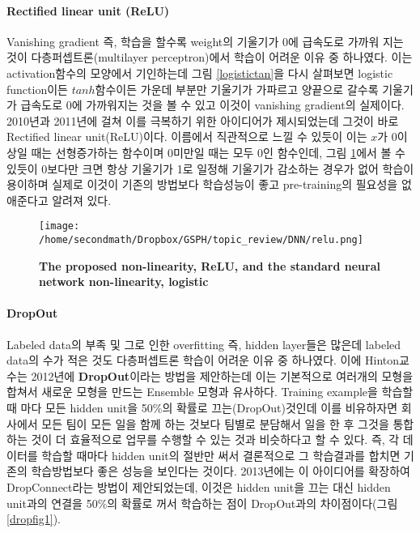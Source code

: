 \documentclass[10pt]{article}
\begin{document}
\paragraph{Rectified linear unit (ReLU)}
Vanishing gradient 즉, 학습을 할수록 weight의 기울기가 0에 급속도로 가까워 지는 것이 다층퍼셉트론(multilayer perceptron)에서 학습이 어려운 이유 중 하나였다. 이는 activation함수의 모양에서 기인하는데 그림 \ref{logistictan}을 다시 살펴보면 logistic function이든 $tanh$함수이든 가운데 부분만 기울기가 가파르고 양끝으로 갈수록 기울기가 급속도로 0에 가까워지는 것을 볼 수 있고 이것이 vanishing gradient의 실제이다. 2010년과 2011년에 걸쳐 이를 극복하기 위한 아이디어가 제시되었는데 그것이 바로 Rectified linear unit(ReLU)이다. 이름에서 직관적으로 느낄 수 있듯이 이는 $x$가 0이상일 때는 선형증가하는 함수이며 0미만일 때는 모두 0인 함수인데, 그림 \ref{relu}에서 볼 수 있듯이 0보다만 크면 항상 기울기가 1로 일정해 기울기가 감소하는 경우가 없어 학습이 용이하며 실제로 이것이 기존의 방법보다 학습성능이 좋고 pre-training의 필요성을 없애준다고 알려져 있다\cite{nair2010rectified,glorot2011deep}. 


\begin{figure}[!ht]
\centering
\texttt{[image: /home/secondmath/Dropbox/GSPH/topic\_review/DNN/relu.png]}
\caption{\bf{The proposed non-linearity, ReLU, and the standard neural network non-linearity, logistic\cite{zeiler2013rectified}}}
\label{relu}
\end{figure}


\paragraph{DropOut}
Labeled data의 부족 및 그로 인한 overfitting 즉, hidden layer들은 많은데 labeled data의 수가 적은 것도 다층퍼셉트론 학습이 어려운 이유 중 하나였다. 이에 Hinton교수는 2012년에 \textbf{DropOut}이라는 방법을 제안하는데 이는 기본적으로 여러개의 모형을 합쳐서 새로운 모형을 만드는 Ensemble 모형과 유사하다\cite{hinton2012improving}. Training example을 학습할 때 마다 모든 hidden unit을 50\%의 확률로 끄는(DropOut)것인데 이를 비유하자면 회사에서 모든 팀이 모든 일을 함께 하는 것보다 팀별로 분담해서 일을 한 후 그것을 통합하는 것이 더 효율적으로 업무를 수행할 수 있는 것과 비슷하다고 할 수 있다. 즉, 각 데이터를 학습할 때마다 hidden unit의 절반만 써서 결론적으로 그 학습결과를 합치면 기존의 학습방법보다 좋은 성능을 보인다는 것이다. 2013년에는 이 아이디어를 확장하여 DropConnect라는 방법이 제안되었는데, 이것은 hidden unit을 끄는 대신 hidden unit과의 연결을 50\%의 확률로 꺼서 학습하는 점이 DropOut과의 차이점이다(그림 \ref{dropfig1})\cite{wan2013regularization}. 
\end{document}
